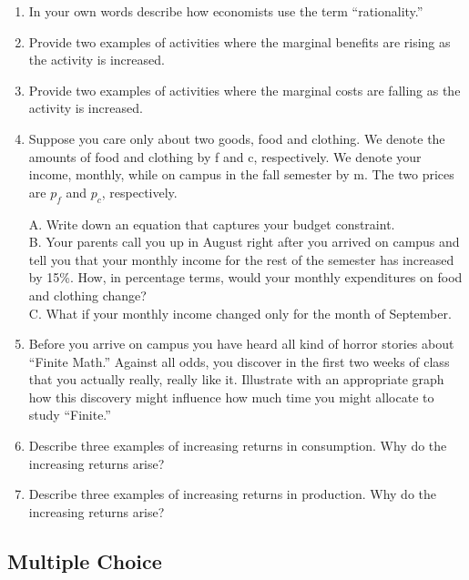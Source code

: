 \documentclass[
]{book}
\begin{document}
\begin{enumerate}
\def\labelenumi{\arabic{enumi}.}
\item
  In your own words describe how economists use the term ``rationality.''
\item
  Provide two examples of activities where the marginal benefits are rising as the activity is increased.
\item
  Provide two examples of activities where the marginal costs are falling as the activity is increased.
\item
  Suppose you care only about two goods, food and clothing. We denote the amounts of food and clothing by f and c, respectively. We denote your income, monthly, while on campus in the fall semester by m. The two prices are \(p_f\) and \(p_c\), respectively.

  A. Write down an equation that captures your budget constraint.\\
  B. Your parents call you up in August right after you arrived on campus and tell you that your monthly income for the rest of the semester has increased by 15\%. How, in percentage terms, would your monthly expenditures on food and clothing change?\\
  C. What if your monthly income changed only for the month of September.
\item
  Before you arrive on campus you have heard all kind of horror stories about ``Finite Math.'' Against all odds, you discover in the first two weeks of class that you actually really, really like it. Illustrate with an appropriate graph how this discovery might influence how much time you might allocate to study ``Finite.''
\item
  Describe three examples of increasing returns in consumption. Why do the increasing returns arise?
\item
  Describe three examples of increasing returns in production. Why do the increasing returns arise?
\end{enumerate}

\hypertarget{multiple-choice-1}{%
\subsection{Multiple Choice}\label{multiple-choice-1}}
\end{document}
